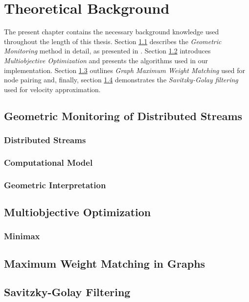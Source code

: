 \chapter{Theoretical Background} \label{chap:theorBack}

The present chapter contains the necessary background knowledge used throughout the length of this thesis. Section \ref{sec:theorBack-GM} describes the \emph{Geometric Monitoring} method in detail, as presented in \cite{GM-sharfmanShusterKeren}. Section \ref{sec:theorBack-MOP} introduces \emph{Multiobjective Optimization} and presents the algorithms used in our implementation. Section \ref{sec:theorBack-MWMGraphs} outlines \emph{Graph Maximum Weight Matching} used for node pairing and, finally, section \ref{sec:theorBack-SavitzkyGolay} demonstrates the \emph{Savitzky-Golay filtering} used for velocity approximation.

\section{Geometric Monitoring of Distributed Streams} \label{sec:theorBack-GM}

\subsection{Distributed Streams} \label{subsec:theorBack-GM-distrStreams}

\subsection{Computational Model} \label{subsec:theorBack-GM-compModel}

\subsection{Geometric Interpretation} \label{subsec:theorBack-GM-geomInt}

\section{Multiobjective Optimization} \label{sec:theorBack-MOP}

\subsection{Minimax} \label{subsec:theorBack-MOP-minimax}

\section{Maximum Weight Matching in Graphs} \label{sec:theorBack-MWMGraphs}

\section{Savitzky-Golay Filtering} \label{sec:theorBack-SavitzkyGolay}